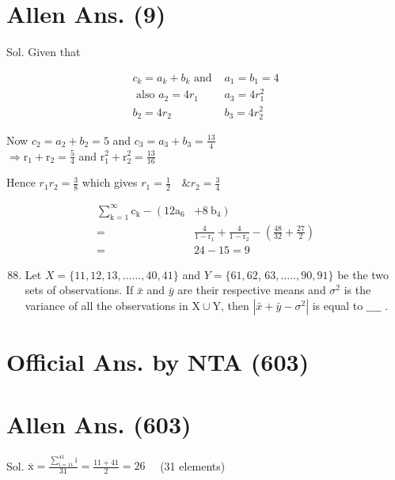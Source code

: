 \documentclass[10pt]{article}
\begin{document}
\section*{Allen Ans. (9)}
Sol. Given that

\[
\begin{aligned}
c_{k}=a_{k}+b_{k} \text { and } & a_{1}=b_{1}=4 \\
\text { also } a_{2}=4 r_{1} & a_{3}=4 r_{1}^{2} \\
b_{2}=4 r_{2} & b_{3}=4 r_{2}^{2}
\end{aligned}
\]

Now \(c_{2}=a_{2}+b_{2}=5\) and \(c_{3}=a_{3}+b_{3}=\frac{13}{4}\)\\
\(\Rightarrow \mathrm{r}_{1}+\mathrm{r}_{2}=\frac{5}{4}\) and \(\mathrm{r}_{1}^{2}+\mathrm{r}_{2}^{2}=\frac{13}{16}\)

Hence \(r_{1} r_{2}=\frac{3}{8}\) which gives \(r_{1}=\frac{1}{2} \quad \& r_{2}=\frac{3}{4}\)

\[
\begin{aligned}
\sum_{\mathrm{k}=1}^{\infty} \mathrm{c}_{\mathrm{k}}-\left(12 \mathrm{a}_{6}\right. & \left.+8 \mathrm{~b}_{4}\right) \\
= & \frac{4}{1-\mathrm{r}_{1}}+\frac{4}{1-\mathrm{r}_{2}}-\left(\frac{48}{32}+\frac{27}{2}\right) \\
= & 24-15=9
\end{aligned}
\]

\begin{enumerate}
  \setcounter{enumi}{87}
  \item Let \(X=\{11,12,13, \ldots \ldots, 40,41\}\) and \(Y=\{61,62\), \(63, \ldots . ., 90,91\}\) be the two sets of observations. If \(\bar{x}\) and \(\bar{y}\) are their respective means and \(\sigma^{2}\) is the variance of all the observations in \(\mathrm{X} \cup \mathrm{Y}\), then \(\left|\bar{x}+\bar{y}-\sigma^{2}\right|\) is equal to \(\_\_\_\_\) .
\end{enumerate}

\section*{Official Ans. by NTA (603)}
\section*{Allen Ans. (603)}
Sol. \(\overline{\mathrm{x}}=\frac{\sum_{\mathrm{i}=11}^{41} \mathrm{i}}{31}=\frac{11+41}{2}=26 \quad\) (31 elements)
\end{document}
